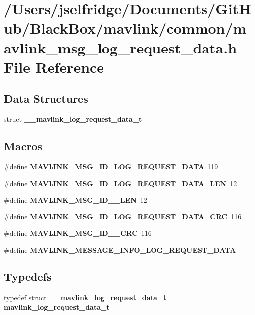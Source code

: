 \section{/\+Users/jselfridge/\+Documents/\+Git\+Hub/\+Black\+Box/mavlink/common/mavlink\+\_\+msg\+\_\+log\+\_\+request\+\_\+data.h File Reference}
\label{mavlink__msg__log__request__data_8h}
\subsection*{Data Structures}
\begin{DoxyCompactItemize}
\item 
struct \textbf{ \+\_\+\+\_\+mavlink\+\_\+log\+\_\+request\+\_\+data\+\_\+t}
\end{DoxyCompactItemize}
\subsection*{Macros}
\begin{DoxyCompactItemize}
\item 
\#define \textbf{ M\+A\+V\+L\+I\+N\+K\+\_\+\+M\+S\+G\+\_\+\+I\+D\+\_\+\+L\+O\+G\+\_\+\+R\+E\+Q\+U\+E\+S\+T\+\_\+\+D\+A\+TA}~119
\item 
\#define \textbf{ M\+A\+V\+L\+I\+N\+K\+\_\+\+M\+S\+G\+\_\+\+I\+D\+\_\+\+L\+O\+G\+\_\+\+R\+E\+Q\+U\+E\+S\+T\+\_\+\+D\+A\+T\+A\+\_\+\+L\+EN}~12
\item 
\#define \textbf{ M\+A\+V\+L\+I\+N\+K\+\_\+\+M\+S\+G\+\_\+\+I\+D\+\_\+\_\+\+L\+EN}~12
\item 
\#define \textbf{ M\+A\+V\+L\+I\+N\+K\+\_\+\+M\+S\+G\+\_\+\+I\+D\+\_\+\+L\+O\+G\+\_\+\+R\+E\+Q\+U\+E\+S\+T\+\_\+\+D\+A\+T\+A\+\_\+\+C\+RC}~116
\item 
\#define \textbf{ M\+A\+V\+L\+I\+N\+K\+\_\+\+M\+S\+G\+\_\+\+I\+D\+\_\+\_\+\+C\+RC}~116
\item 
\#define \textbf{ M\+A\+V\+L\+I\+N\+K\+\_\+\+M\+E\+S\+S\+A\+G\+E\+\_\+\+I\+N\+F\+O\+\_\+\+L\+O\+G\+\_\+\+R\+E\+Q\+U\+E\+S\+T\+\_\+\+D\+A\+TA}
\end{DoxyCompactItemize}
\subsection*{Typedefs}
\begin{DoxyCompactItemize}
\item 
typedef struct \textbf{ \+\_\+\+\_\+mavlink\+\_\+log\+\_\+request\+\_\+data\+\_\+t} \textbf{ mavlink\+\_\+log\+\_\+request\+\_\+data\+\_\+t}
\end{DoxyCompactItemize}


